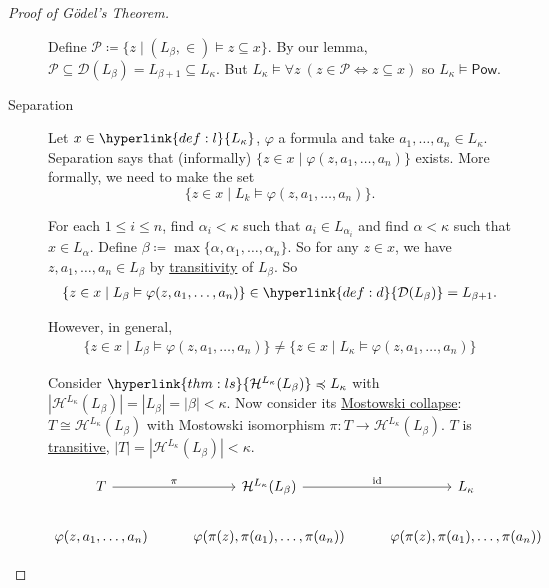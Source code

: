 \documentclass{article}
\newcommand{\1}{\mathbbm{1}}
\let\models\vDash
\begin{document}
\begin{proof}[Proof of G\"odel's Theorem]
\begin{description}
      Define $\mathcal{P} \coloneqq \{z \mid (L_\beta, \in) \models z \subseteq x\}$. By our lemma, $\mathcal{P} \subseteq \mathcal{D}(L_\beta) = L_{\beta+1} \subseteq L_\kappa$.
      But $L_\kappa \models \forall z\ (z \in \mathcal{P} \iff z \subseteq x)$ so $L_\kappa \models \textsf{Pow}$.

    \item[Separation] \newlec Let $x \in \hyperlink{def:l}{L_\kappa}$, $\varphi$ a formula and take $a_1, \dotsc, a_n \in L_\kappa$.
      Separation says that (informally) $\{z \in x \mid \varphi(z,a_1, \dotsc, a_n)\}$ exists.
      More formally, we need to make the set
      \begin{equation*}
      \{z \in x \mid L_k \models \varphi(z, a_1, \dotsc, a_n)\}.
      \end{equation*}

      For each $1 \leq i \leq n$, find $\alpha_i < \kappa$ such that $a_i \in L_{\alpha_i}$ and find $\alpha < \kappa$ such that $x \in L_\alpha$.
      Define $\beta \coloneqq \max\{\alpha,\alpha_1, \dotsc, \alpha_n\}$.
      So for any $z \in x$, we have $z,a_1,\dotsc,a_n \in L_\beta$ by \hyperlink{def:transitive}{transitivity} of $L_\beta$.
      So
      \begin{align*}
        \{z \in x \mid L_\beta \models \varphi(z,a_1,\dotsc,a_n)\} \in \hyperlink{def:d}{\mathcal{D}(L_\beta)} = L_{\beta+1}.
      \end{align*}

      However, in general,
      \begin{align*}
        \{z \in x \mid L_\beta \models \varphi(z,a_1,\dotsc,a_n)\} \neq \{z \in x \mid L_\kappa \models \varphi(z,a_1,\dotsc,a_n)\}
      \end{align*}

    Consider $\hyperlink{thm:ls}{\mathcal{H}^{L_\kappa}(L_\beta)} \preccurlyeq L_\kappa$ with $|\mathcal{H}^{L_\kappa}(L_\beta)| = |L_\beta| = |\beta| < \kappa$.
    Now consider its \hyperlink{thm:mct}{Mostowski collapse}: $T \cong \mathcal{H}^{L_\kappa}(L_\beta)$ with Mostowski isomorphism $\pi: T \to \mathcal{H}^{L_\kappa}(L_\beta)$.
    $T$ is \hyperlink{def:transitive}{transitive}, $|T| = |\mathcal{H}^{L_\kappa}(L_\beta)| < \kappa$.

    \begin{equation*}
    \begin{tikzcd}
      T \rar{\pi}& \mathcal{H}^{L_\kappa}(L_\beta) \rar{\text{id}}& L_\kappa   \\
      \varphi(z,a_1, \dotsc, a_n) & \varphi(\pi(z),\pi(a_1),\dotsc,\pi(a_n)) & \varphi(\pi(z),\pi(a_1),\dotsc,\pi(a_n))
    \end{tikzcd}
    \end{equation*}


\end{description}
\end{proof}
\end{document}
